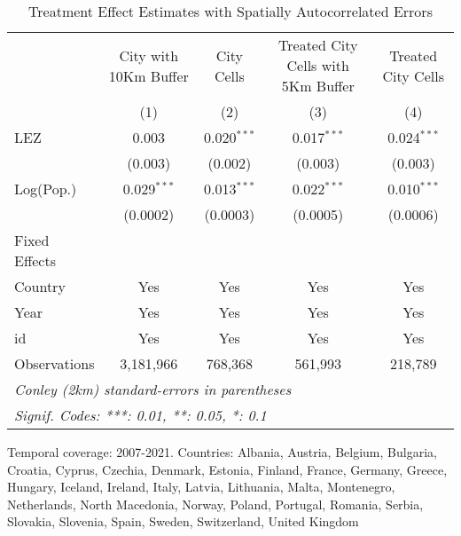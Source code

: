 
\begin{table}[htbp]
   \caption{\label{tab:te_conley} Treatment Effect Estimates with Spatially Autocorrelated Errors}
   \centering
   \small
   \begin{tabular}{lcccc}
      \tabularnewline \midrule \midrule
                   & City with 10Km Buffer & City Cells    & Treated City Cells with 5Km Buffer & Treated City Cells \\   
                   & (1)                   & (2)           & (3)                                & (4)\\  
      LEZ          & 0.003                 & 0.020$^{***}$ & 0.017$^{***}$                      & 0.024$^{***}$\\   
                   & (0.003)               & (0.002)       & (0.003)                            & (0.003)\\   
      Log(Pop.)    & 0.029$^{***}$         & 0.013$^{***}$ & 0.022$^{***}$                      & 0.010$^{***}$\\   
                   & (0.0002)              & (0.0003)      & (0.0005)                           & (0.0006)\\   
      Fixed Effects\\
      Country      & Yes                   & Yes           & Yes                                & Yes\\  
      Year         & Yes                   & Yes           & Yes                                & Yes\\  
      id           & Yes                   & Yes           & Yes                                & Yes\\  
      \midrule 
      Observations & 3,181,966             & 768,368       & 561,993                            & 218,789\\  
      \midrule \midrule
      \multicolumn{5}{l}{\emph{Conley (2km) standard-errors in parentheses}}\\
      \multicolumn{5}{l}{\emph{Signif. Codes: ***: 0.01, **: 0.05, *: 0.1}}\\
   \end{tabular}
   
   \par \raggedright 
   Temporal coverage: 2007-2021. Countries: Albania, Austria, Belgium, Bulgaria, Croatia, Cyprus, Czechia, Denmark, Estonia, Finland, France, Germany, Greece, Hungary, Iceland, Ireland, Italy, Latvia, Lithuania, Malta, Montenegro, Netherlands, North Macedonia, Norway, Poland, Portugal, Romania, Serbia, Slovakia, Slovenia, Spain, Sweden, Switzerland, United Kingdom
\end{table}



